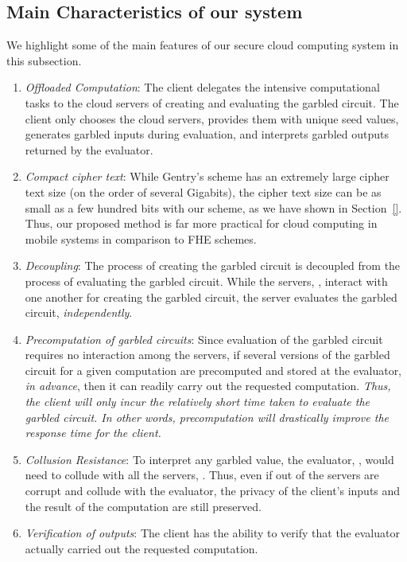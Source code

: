 \documentclass[10pt,journal,cspaper,compsoc]{IEEEtran}
\begin{document}
\subsection{Main Characteristics of our system}
\label{sec_features_of_our_secure_cloud_computing_model}
We highlight some of the main features of our secure cloud computing system in this subsection.
\begin{enumerate}
    \item{{\em Offloaded Computation}: The client delegates the intensive computational tasks to the cloud servers of creating and evaluating the garbled circuit. The client only chooses the cloud servers, provides them with unique seed values, generates garbled inputs during evaluation, and interprets garbled outputs returned by the evaluator.}

    \item{{\em Compact cipher text}: While Gentry's scheme has an extremely large cipher text size (on the order of several Gigabits), the cipher text size can be as small as a few hundred bits with our scheme, as we have shown in Section~\ref{}. Thus, our proposed method is far more practical for cloud computing in mobile systems in comparison to FHE schemes.}

    \item{{\em Decoupling}: The process of creating the garbled circuit is decoupled from the process of evaluating the garbled circuit. While the servers, , interact with one another for creating the garbled circuit, the server  evaluates the garbled circuit, {\em independently}.}

    \item{{\em Precomputation of garbled circuits}: Since evaluation of the garbled circuit requires no interaction among the servers, if several versions of the garbled circuit for a given computation are precomputed and stored at the evaluator, {\em in advance}, then it can readily carry out the requested computation. {\em Thus, the client will only incur the relatively short time taken to evaluate the garbled circuit. In other words, precomputation will drastically improve the response time for the client.}}

    \item{{\em Collusion Resistance}: To interpret any garbled value, the evaluator, , would need to collude with all the  servers, . Thus, even if  out of the  servers are corrupt and collude with the evaluator, the privacy of the client's inputs and the result of the computation are still preserved.}

    \item{{\em Verification of outputs}: The client has the ability to verify that the evaluator actually carried out the requested computation. }
\end{enumerate}
\end{document}

